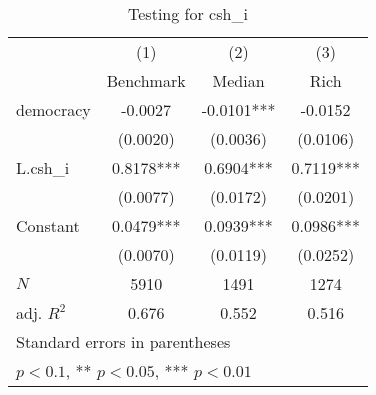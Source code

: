\begin{table}[htbp]\centering
\def\sym#1{\ifmmode^{#1}\else\(^{#1}\)\fi}
\caption{Testing for csh\_i \label{tab:regression2}}
\begin{tabular}{l*{3}{c}}
\hline\hline
            &\multicolumn{1}{c}{(1)}&\multicolumn{1}{c}{(2)}&\multicolumn{1}{c}{(3)}\\
            &\multicolumn{1}{c}{Benchmark}&\multicolumn{1}{c}{Median}&\multicolumn{1}{c}{Rich}\\
\hline
democracy   &     -0.0027   &     -0.0101***&     -0.0152   \\
            &    (0.0020)   &    (0.0036)   &    (0.0106)   \\
[1em]
L.csh\_i     &      0.8178***&      0.6904***&      0.7119***\\
            &    (0.0077)   &    (0.0172)   &    (0.0201)   \\
[1em]
Constant    &      0.0479***&      0.0939***&      0.0986***\\
            &    (0.0070)   &    (0.0119)   &    (0.0252)   \\
\hline
\(N\)       &        5910   &        1491   &        1274   \\
adj. \(R^{2}\)&       0.676   &       0.552   &       0.516   \\
\hline\hline
\multicolumn{4}{l}{\footnotesize Standard errors in parentheses}\\
\multicolumn{4}{l}{\footnotesize * \(p<0.1\), ** \(p<0.05\), *** \(p<0.01\)}\\
\end{tabular}
\end{table}
